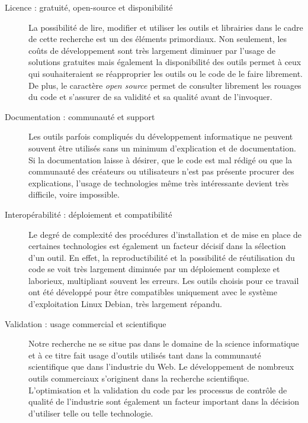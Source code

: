 \begin{description}
    \item[Licence : gratuité, open-source et disponibilité]
        La possibilité de lire, modifier et utiliser les outils et librairies dans le cadre de cette recherche est un des éléments primordiaux. Non seulement, les coûts de développement sont très largement diminuer par l'usage de solutions gratuites mais également la disponibilité des outils permet à ceux qui souhaiteraient se réapproprier les outils ou le code de le faire librement. De plus, le caractère \textit{open source} permet de consulter librement les rouages du code et s'assurer de sa validité et sa qualité avant de l'invoquer.

    \item[Documentation : communauté et support]
        Les outils parfois compliqués du développement informatique ne peuvent souvent être utilisés sans un minimum d'explication et de documentation. Si la documentation laisse à désirer, que le code est mal rédigé ou que la communauté des créateurs ou utilisateurs n'est pas présente procurer des explications, l'usage de technologies même très intéressante devient très difficile, voire impossible.

    \item[Interopérabilité : déploiement et compatibilité]
        Le degré de complexité des procédures d'installation et de mise en place de certaines technologies est également un facteur décisif dans la sélection d'un outil. En effet, la reproductibilité et la possibilité de réutilisation du code se voit très largement diminuée par un déploiement complexe et laborieux, multipliant souvent les erreurs. Les outils choisis pour ce travail ont été développé pour être compatibles uniquement avec le système d'exploitation Linux Debian, très largement répandu.

    \item[Validation : usage commercial et scientifique]
        Notre recherche ne se situe pas dans le domaine de la science informatique et à ce titre fait usage d'outils utilisés tant dans la communauté scientifique que dans l'industrie du Web. Le développement de nombreux  outils commerciaux s'originent dans la recherche scientifique. L'optimisation et la validation du code par les processus de contrôle de qualité de l'industrie sont également un facteur important dans la décision d'utiliser telle ou telle technologie.

\end{description}


